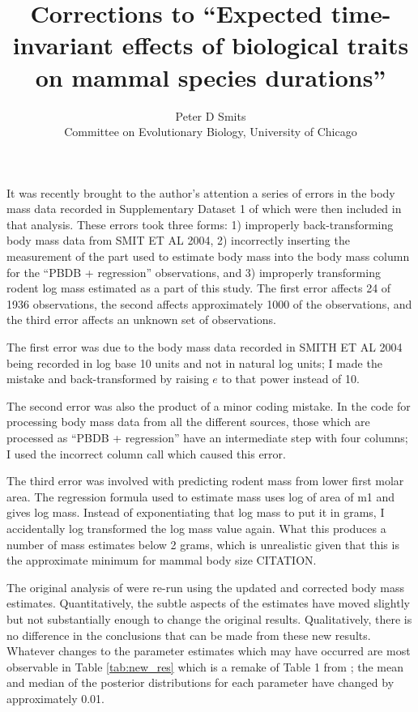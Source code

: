 \documentclass{article}
\title{Corrections to ``Expected time-invariant effects of biological traits on mammal species durations''}
\author{Peter D Smits\\Committee on Evolutionary Biology, University of Chicago}
\begin{document}
\maketitle

It was recently brought to the author's attention a series of errors in the body mass data recorded in Supplementary Dataset 1 of \citep{Smits2015} which were then included in that analysis. These errors took three forms: 1) improperly back-transforming body mass data from SMIT ET AL 2004, 2) incorrectly inserting the measurement of the part used to estimate body mass into the body mass column for the ``PBDB + regression'' observations, and 3) improperly transforming rodent log mass estimated as a part of this study. The first error affects 24 of 1936 observations, the second affects approximately 1000 of the observations, and the third error affects an unknown set of observations.

The first error was due to the body mass data recorded in SMITH ET AL 2004 being recorded in log base 10 units and not in natural log units; I made the mistake and back-transformed by raising \(e\) to that power instead of 10. 

The second error was also the product of a minor coding mistake. In the code for processing body mass data from all the different sources, those which are processed as ``PBDB + regression'' have an intermediate step with four columns; I used the incorrect column call which caused this error. 

The third error was involved with predicting rodent mass from lower first molar area. The regression formula used to estimate mass uses log of area of m1 and gives log mass. Instead of exponentiating that log mass to put it in grams, I accidentally log transformed the log mass value again. What this produces a number of mass estimates below 2 grams, which is unrealistic given that this is the approximate minimum for mammal body size CITATION. 

The original analysis of \citep{Smits2015} were re-run using the updated and corrected body mass estimates. Quantitatively, the subtle aspects of the estimates have moved slightly but not substantially enough to change the original results. Qualitatively, there is no difference in the conclusions that can be made from these new results. Whatever changes to the parameter estimates which may have occurred are most observable in Table \ref{tab:new_res} which is a remake of Table 1 from \citet{Smits2015}; the mean and median of the posterior distributions for each parameter have changed by approximately 0.01.
\end{document}
